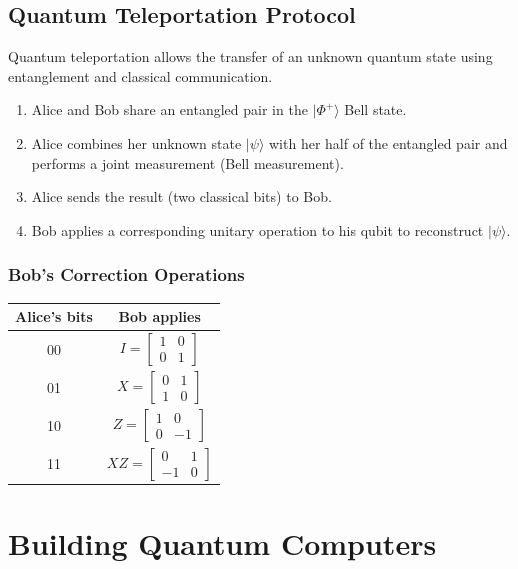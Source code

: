 \documentclass{book}
\begin{document}
\section{Quantum Teleportation Protocol}
Quantum teleportation allows the transfer of an unknown quantum state using entanglement and classical communication.

\begin{enumerate}
    \item Alice and Bob share an entangled pair in the $|\Phi^+\rangle$ Bell state.
    \item Alice combines her unknown state $|\psi\rangle$ with her half of the entangled pair and performs a joint measurement (Bell measurement).
    \item Alice sends the result (two classical bits) to Bob.
    \item Bob applies a corresponding unitary operation to his qubit to reconstruct $|\psi\rangle$.
\end{enumerate}

\subsection*{Bob's Correction Operations}
\begin{center}
\begin{tabular}{|c|c|}
\hline
Alice's bits & Bob applies \\
\hline
00 & $I = \begin{bmatrix} 1 & 0 \\ 0 & 1 \end{bmatrix}$ \\
01 & $X = \begin{bmatrix} 0 & 1 \\ 1 & 0 \end{bmatrix}$ \\
10 & $Z = \begin{bmatrix} 1 & 0 \\ 0 & -1 \end{bmatrix}$ \\
11 & $XZ = \begin{bmatrix} 0 & 1 \\ -1 & 0 \end{bmatrix}$ \\
\hline
\end{tabular}
\end{center}



\chapter{Building Quantum Computers}
\end{document}
